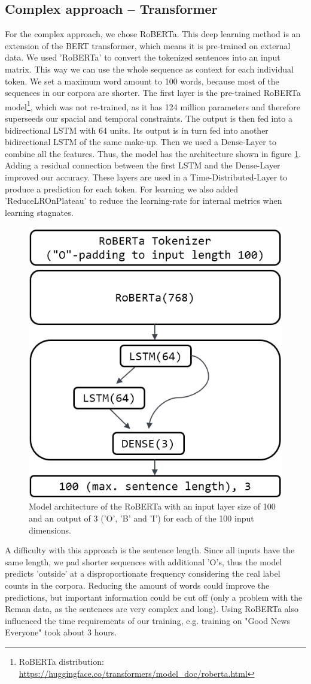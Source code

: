 \documentclass[12pt,pdftex,a4paper]{scrartcl}
\begin{document}
\subsection{Complex approach -- Transformer}\label{sec:trans}
For the complex approach, we chose RoBERTa. This deep learning method is an extension of the BERT transformer, which means it is pre-trained on external data. We used 'RoBERTa' to convert the tokenized sentences into an input matrix. This way we can use the whole sequence as context for each individual token. We set a maximum word amount to 100 words, because most of the sequences in our corpora are shorter. The first layer is the pre-trained RoBERTa model\footnote{RoBERTa distribution: \url{https://huggingface.co/transformers/model_doc/roberta.html}}, which was not re-trained, as it has 124 million parameters and therefore superseeds our spacial and temporal constraints. The output is then fed into a bidirectional LSTM with 64 units. Its output is in turn fed into another bidirectional LSTM of the same make-up. Then we used a Dense-Layer to combine all the features. Thus, the model has the architecture shown in figure \ref{arch}. Adding a residual connection between the first LSTM and the Dense-Layer improved our accuracy. These layers are used in a Time-Distributed-Layer to produce a prediction for each token. For learning we also added 'ReduceLROnPlateau' to reduce the learning-rate for internal metrics when learning stagnates.

\begin{figure}
\centering \includegraphics[width=.45\textwidth]{roberta-arch} 

\caption{Model architecture of the RoBERTa with an input layer size of 100 and an output of 3 ('O', 'B' and 'I') for each of the 100 input dimensions.}\label{arch}
\end{figure}

A difficulty with this approach is the sentence length. Since all inputs have the same length, we pad shorter sequences with additional 'O's, thus the model predicts 'outside' at a disproportionate frequency considering the real label counts in the corpora. Reducing the amount of words could improve the predictions, but important information could be cut off (only a problem with the Reman data, as the sentences are very complex and long). Using RoBERTa also influenced the time requirements of our training, e.g. training on "Good News Everyone" took about 3 hours.
\end{document}
